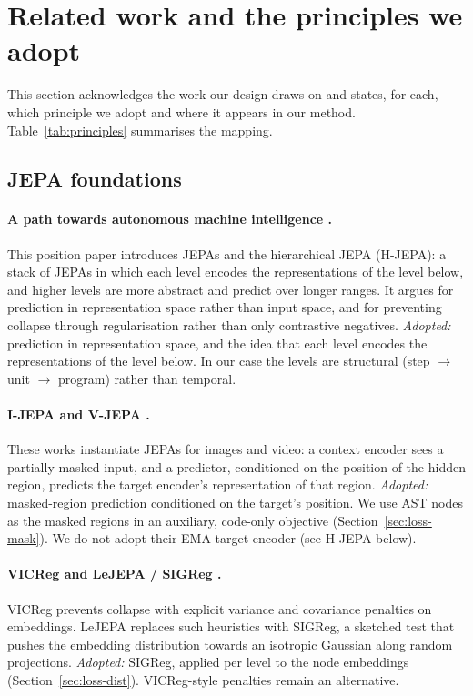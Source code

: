 \documentclass[11pt]{article}
\begin{document}
\section{Related work and the principles we adopt}
\label{sec:related}

This section acknowledges the work our design draws on and states, for each, which principle we adopt and where it
appears in our method. Table~\ref{tab:principles} summarises the mapping.

\subsection{JEPA foundations}

\paragraph{A path towards autonomous machine intelligence \citep{lecun2022path}.}
This position paper introduces JEPAs and the hierarchical JEPA (H-JEPA): a stack of JEPAs in which each level
encodes the representations of the level below, and higher levels are more abstract and predict over longer ranges.
It argues for prediction in representation space rather than input space, and for preventing collapse through
regularisation rather than only contrastive negatives.
\emph{Adopted:} prediction in representation space, and the idea that each level encodes the representations of the
level below. In our case the levels are structural (step $\to$ unit $\to$ program) rather than temporal.

\paragraph{I-JEPA \citep{assran2023ijepa} and V-JEPA \citep{bardes2024vjepa}.}
These works instantiate JEPAs for images and video: a context encoder sees a partially masked input, and a predictor,
conditioned on the position of the hidden region, predicts the target encoder's representation of that region.
\emph{Adopted:} masked-region prediction conditioned on the target's position. We use AST nodes as the masked regions
in an auxiliary, code-only objective (Section~\ref{sec:loss-mask}). We do not adopt their EMA target encoder (see
H-JEPA below).

\paragraph{VICReg \citep{bardes2022vicreg} and LeJEPA / SIGReg \citep{balestriero2025lejepa}.}
VICReg prevents collapse with explicit variance and covariance penalties on embeddings. LeJEPA replaces such
heuristics with SIGReg, a sketched test that pushes the embedding distribution towards an isotropic Gaussian along
random projections.
\emph{Adopted:} SIGReg, applied per level to the node embeddings (Section~\ref{sec:loss-dist}). VICReg-style
penalties remain an alternative.
\end{document}
